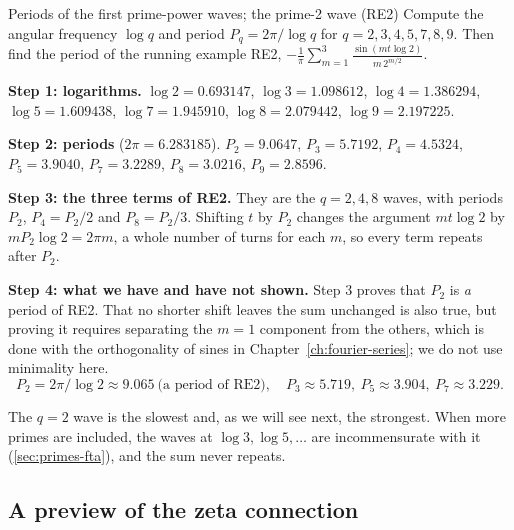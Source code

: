 \begin{sample}{Periods of the first prime-power waves; the prime-2 wave (RE2)}
Compute the angular frequency $\log q$ and period $P_q=2\pi/\log q$ for $q=2,3,4,5,7,8,9$. Then find the period of the running example RE2, $-\frac1\pi\sum_{m=1}^{3}\frac{\sin(mt\log2)}{m\,2^{m/2}}$.

\textbf{Step 1: logarithms.} $\log2=0.693147$, $\log3=1.098612$, $\log4=1.386294$, $\log5=1.609438$, $\log7=1.945910$, $\log8=2.079442$, $\log9=2.197225$.

\textbf{Step 2: periods} ($2\pi=6.283185$). $P_2=9.0647$, $P_3=5.7192$, $P_4=4.5324$, $P_5=3.9040$, $P_7=3.2289$, $P_8=3.0216$, $P_9=2.8596$.

\textbf{Step 3: the three terms of RE2.} They are the $q=2,4,8$ waves, with periods $P_2$, $P_4=P_2/2$ and $P_8=P_2/3$. Shifting $t$ by $P_2$ changes the argument $mt\log2$ by $mP_2\log2=2\pi m$, a whole number of turns for each $m$, so every term repeats after $P_2$.

\textbf{Step 4: what we have and have not shown.} Step 3 proves that $P_2$ is \emph{a} period of RE2. That no shorter shift leaves the sum unchanged is also true, but proving it requires separating the $m=1$ component from the others, which is done with the orthogonality of sines in Chapter~\ref{ch:fourier-series}; we do not use minimality here.
\[
\boxed{P_2=2\pi/\log2\approx9.065\ \text{(a period of RE2)},\quad P_3\approx5.719,\ P_5\approx3.904,\ P_7\approx3.229.}
\]
\end{sample}

The $q=2$ wave is the slowest and, as we will see next, the strongest. When more primes are included, the waves at $\log3,\log5,\dots$ are incommensurate with it (\cref{sec:primes-fta}), and the sum never repeats.

\subsection{A preview of the zeta connection}

